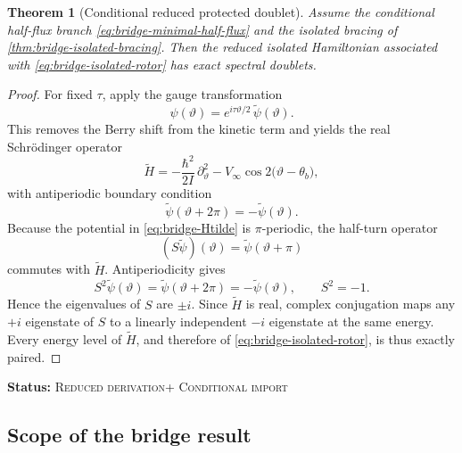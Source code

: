 \documentclass[11pt]{article}
\theoremstyle{plain}
\newtheorem{theorem}{Theorem}[section]
\theoremstyle{definition}
\theoremstyle{remark}
\newcommand{\statusReduced}{\textsc{Reduced derivation}}
\newcommand{\statusConditional}{\textsc{Conditional import}}
\newcommand{\claimstatus}[1]{\par\smallskip\noindent\textbf{Status:} #1\par\smallskip}
\newcommand{\throt}{\vartheta}
\begin{document}
\begin{theorem}[Conditional reduced protected doublet]\label{thm:bridge-protected-doublet}
Assume the conditional half-flux branch \cref{eq:bridge-minimal-half-flux} and the isolated bracing of \cref{thm:bridge-isolated-bracing}. Then the reduced isolated Hamiltonian associated with \cref{eq:bridge-isolated-rotor} has exact spectral doublets.
\end{theorem}
\begin{proof}
For fixed \(\tau\), apply the gauge transformation
\begin{equation}
\psi(\throt)=e^{i\tau\throt/2}\,\widetilde\psi(\throt).
\label{eq:bridge-gauge-transform}
\end{equation}
This removes the Berry shift from the kinetic term and yields the real Schr\"odinger operator
\begin{equation}
\widetilde H
=
-\frac{\hbar^2}{2I}\,\partial_{\throt}^2
-V_\infty\cos 2\bigl(\throt-\theta_b\bigr),
\label{eq:bridge-Htilde}
\end{equation}
with antiperiodic boundary condition
\begin{equation}
\widetilde\psi(\throt+2\pi)=-\widetilde\psi(\throt).
\label{eq:bridge-antiperiodic-bc}
\end{equation}
Because the potential in \cref{eq:bridge-Htilde} is \(\pi\)-periodic, the half-turn operator
\begin{equation}
(S\widetilde\psi)(\throt)=\widetilde\psi(\throt+\pi)
\label{eq:bridge-halfturn}
\end{equation}
commutes with \(\widetilde H\). Antiperiodicity gives
\begin{equation}
S^2\widetilde\psi(\throt)=\widetilde\psi(\throt+2\pi)=-\widetilde\psi(\throt),
\qquad
S^2=-1.
\label{eq:bridge-S2}
\end{equation}
Hence the eigenvalues of \(S\) are \(\pm i\). Since \(\widetilde H\) is real, complex conjugation maps any \(+i\) eigenstate of \(S\) to a linearly independent \(-i\) eigenstate at the same energy. Every energy level of \(\widetilde H\), and therefore of \cref{eq:bridge-isolated-rotor}, is thus exactly paired.
\end{proof}
\claimstatus{\statusReduced + \statusConditional}

\subsection{Scope of the bridge result}\label{subsec:bridge-scope}
\end{document}
